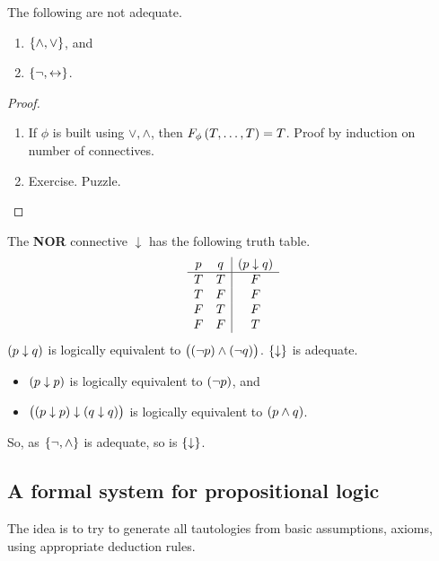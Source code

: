 \begin{example}
The following are not adequate.
\begin{enumerate}
\item $ \cbr{\land, \lor} $, and
\item $ \cbr{\neg, \leftrightarrow} $.
\end{enumerate}
\end{example}

\begin{proof}
\hfill
\begin{enumerate}
\item If $ \phi $ is built using $ \lor, \land $, then $ F_\phi\br{T, \dots, T} = T $. Proof by induction on number of connectives.
\item Exercise. Puzzle.
\end{enumerate}
\end{proof}

\begin{example}
The \textbf{NOR} connective $ \downarrow $ has the following truth table.
$$
\begin{array}{cc|c}
p & q & \br{p \downarrow q} \\
\hline
T & T & F \\
T & F & F \\
F & T & F \\
F & F & T
\end{array}
$$
$ \br{p \downarrow q} $ is logically equivalent to $ \andb{\notb{p}}{\notb{q}} $. $ \cbr{\downarrow} $ is adequate.
\begin{itemize}
\item $ \br{p \downarrow p} $ is logically equivalent to $ \notb{p} $, and
\item $ \br{\br{p \downarrow p} \downarrow \br{q \downarrow q}} $ is logically equivalent to $ \andb{p}{q} $.
\end{itemize}
So, as $ \cbr{\neg, \land} $ is adequate, so is $ \cbr{\downarrow} $.
\end{example}

\pagebreak

\subsection{A formal system for propositional logic}

The idea is to try to generate all tautologies from basic assumptions, axioms, using appropriate deduction rules.

